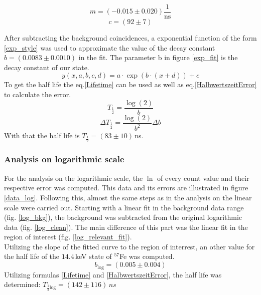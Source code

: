 \documentclass[30pt,a4paper]{article}
\begin{document}
 	\begin{equation*}
 	m = (-0.015 \pm 0.020)\frac{1}{\textrm{ns}}
 	\end{equation*}
 	$$c = (92 \pm 7)$$
 	
 	
 
 	
 	\FloatBarrier
 	After subtracting the background coincidences, a exponential function of the form
 	\ref{exp_style} was used to approximate the value of the decay constant $b=(0.0083\pm0.0010)$ in the fit. The parameter b in figure \ref{exp_fit} is the decay constant of our state. 
 	\begin{equation}
 	y\left(x,a,b,c,d\right) = a \cdot \exp\left(b\cdot\left(x+d\right)\right) + c
 	\label{exp_style}
 	\end{equation}
 	To get the half life the eq.\ref{Lifetime} can be used as well as eq.\ref{HalbwertszeitError} to calculate the error.
 	\begin{equation}
 	T_\frac{1}{2}=\frac{\log(2)}{b}
 	\label{Lifetime} 
 	\end{equation}
 	\begin{equation}
 	\Delta T_\frac{1}{2}=\frac{\log(2)}{b^2}\Delta b
 	\label{HalbwertszeitError} 
 	\end{equation}
 	With that the half life is $T_\frac{1}{2}=(83\pm10)$\,ns.
	\subsubsection{Analysis on logarithmic scale}
	For the analysis on the logarithmic scale, the $\ln$ of every count value and their
	respective error was computed. This data and its errors are illustrated in figure 
	\ref{data_log}. Following this, almost the same steps as in the analysis on the linear scale
	were carried out. Starting with a linear fit in the background data range (fig. \ref{log_bkg}), the background was subtracted from the original logarithmic data (fig. \ref{log_clean}). The main difference of this part was the linear fit 
	in the region of interest (fig. \ref{log_relevant_fit}).\\
	Utilizing the slope of the fitted curve to the region of interrest, an other value for the half life of the $14.4$\,keV state of $^{57}$Fe was computed.
	$$b_{\textrm{log}} = (0.005\pm0.004)$$
	Utilizing formulas \ref{Lifetime} and \ref{HalbwertszeitError}, the half life was
	determined:	$T_{\frac{1}{2} \textrm{log}} = (142\pm 116)\,ns$
	
\end{document}

